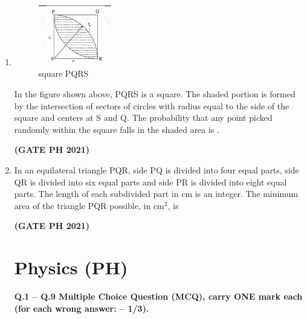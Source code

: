 \documentclass[14pt, a4paper]{extarticle}
\begin{document}
\begin{enumerate}[label=\textbf{Q.\arabic*}]
\item 
\begin{figure}[H]
\centering
\includegraphics[width=0.3\textwidth]{figs/q9fig21.png}
\caption{square PQRS}
\label{fig:q9}
\end{figure}
In the figure shown above, PQRS is a square. The shaded portion is formed by the intersection of sectors of circles with radius equal to the side of the square and centers at S and Q.
The probability that any point picked randomly within the square falls in the shaded area is \underline{\hspace{3cm}}.
\begin{enumerate}
\end{enumerate}
\hfill \textbf{(GATE PH 2021)}

\item In an equilateral triangle PQR, side PQ is divided into four equal parts, side QR is divided into six equal parts and side PR is divided into eight equal parts. The length of each subdivided part in cm is an integer.
The minimum area of the triangle PQR possible, in cm$^2$, is
\begin{enumerate}
\end{enumerate}
\hfill \textbf{(GATE PH 2021)}

\section*{Physics (PH)}
\textbf{Q.1 – Q.9 Multiple Choice Question (MCQ), carry ONE mark each (for each wrong answer: – 1/3).}


\end{enumerate}
\end{document}
